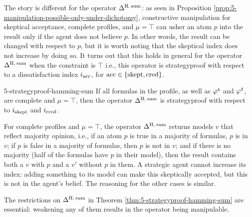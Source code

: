 The story is different for the operator $\Delta^{{\operatorname{H}},\:{\operatorname{sum}}}$: 
as seen in Proposition \ref{prop:5-manipulation-possible-only-under-dichotomy}, 
constructive manipulation for skeptical acceptance, 
complete profiles, and $\mu=\top$ can usher an atom $p$ into the result 
only if the agent does not believe $p$.
In other words, the result can be changed with respect to $p$, 
but it is worth noting that the skeptical index does not increase
by doing so. It turns out that this holds in general 
for the operator $\Delta^{{\operatorname{H}},\:{\operatorname{sum}}}$ when the constraint is $\top$ 
i.e., this operator is strategyproof with respect to a dissatisfaction 
index $i_{\operatorname{acc}}$, for ${\operatorname{acc}}\in\{{\operatorname{skept}},{\operatorname{cred}}\}$.

\begin{thm}{}{5-strategyproof-hamming-sum}
	If all formulas in the profile, as well as ${\varphi}^{\mathtt{t}}$ and ${\varphi}^{\mathtt{f}}$, are complete and $\mu=\top$,
	then the operator $\Delta^{{\operatorname{H}},\:{\operatorname{sum}}}$ is strategyproof with respect to $i_{{\operatorname{skept}}}$ and $i_{{\operatorname{cred}}}$.
\end{thm}
\begin{prf*}{}{}%
	For complete profiles and $\mu=\top$, 
	the operator $\Delta^{{\operatorname{H}},\:{\operatorname{sum}}}$ returns models 
	$v$ that reflect majority opinion,
	i.e., if an atom $p$ is true in a majority of formulas, 
	$p$ is in $v$; if $p$ is false in a majority of formulas, then $p$ is not in $v$; and if 
	there is no majority (half of the formulas have $p$ in their model), 
	then the result contains both a $v$ with $p$ and a $v'$ without $p$ in them. 
	A strategic agent cannot increase its index: 
	adding something to its model can make this skeptically accepted, 
	but this is not in the agent's belief. 
	The reasoning for the other cases is similar.
\end{prf*}

The restrictions on $\Delta^{{\operatorname{H}},\:{\operatorname{sum}}}$ in Theorem \ref{thm:5-strategyproof-hamming-sum} 
are essential: weakening any of them results in the operator being manipulable.

